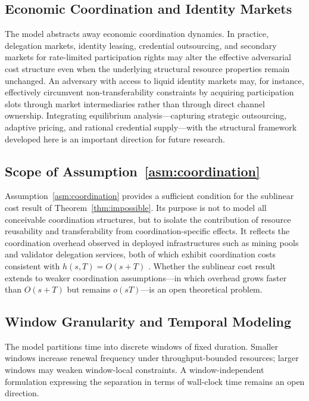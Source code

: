 \documentclass[manuscript,review]{acmart}
\theoremstyle{remark}
\begin{document}
	\subsection{Economic Coordination and Identity Markets}
	\label{ssec:lim_markets}
	
	The model abstracts away economic coordination
	dynamics.
	In practice, delegation markets, identity leasing,
	credential outsourcing, and secondary markets for
	rate-limited participation rights may alter the
	effective adversarial cost structure even when the
	underlying structural resource properties remain
	unchanged.
	An adversary with access to liquid identity markets
	may, for instance, effectively circumvent
	non-transferability constraints by acquiring
	participation slots through market intermediaries
	rather than through direct channel ownership.
	Integrating equilibrium analysis---capturing
	strategic outsourcing, adaptive pricing, and
	rational credential supply---with the structural
	framework developed here is an important direction
	for future research.
	
	\subsection{Scope of Assumption~\ref{asm:coordination}}
	\label{ssec:lim_assumption}
	
	Assumption~\ref{asm:coordination} provides a
	sufficient condition for the sublinear cost result of
	Theorem~\ref{thm:impossible}.
	Its purpose is not to model all conceivable
	coordination structures, but to isolate the
	contribution of resource reusability and
	transferability from coordination-specific effects.
	It reflects the coordination overhead observed in
	deployed infrastructures such as mining pools and
	validator delegation services, both of which exhibit
	coordination costs consistent with
	$h(s,T)=O(s+T)$
	\cite{rosenfeld2011analysis,saleh2021blockchain}.
	Whether the sublinear cost result extends to weaker
	coordination assumptions---in which overhead grows
	faster than $O(s + T)$ but remains $o(sT)$---is
	an open theoretical problem.
	
	\subsection{Window Granularity and Temporal Modeling}
	\label{ssec:lim_windows}
	
	The model partitions time into discrete windows of
	fixed duration.
	Smaller windows increase renewal frequency under
	throughput-bounded resources; larger windows may
	weaken window-local constraints.
	A window-independent formulation expressing the
	separation in terms of wall-clock time remains an
	open direction.
	
\end{document}
